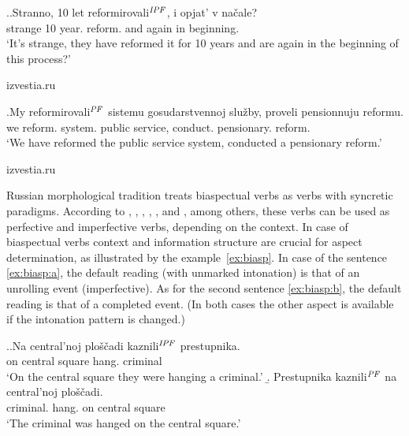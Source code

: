 \ex.\label{ex:biaspectual:borrowed}\ag.Stranno, 10 let reformirovali$^{\mathit{IPF}}$, i opjat' v na\v{c}ale?\\
strange 10 year. reform. and again in beginning.\\
\vspace{0.5em}
`It's strange, they have reformed it for 10 years and are again in the beginning of this process?'
\begin{flushright}
\vspace{-0.5em}
izvestia.ru
\end{flushright}
\bg.My reformirovali$^{\mathit{PF}}$ sistemu gosudarstvennoj slu\v{z}by, proveli pensionnuju reformu.\\
we reform. system. public service, conduct. pensionary. reform.\\
\vspace{0.5em}
`We have reformed the public service system, conducted a pensionary reform.'
\begin{flushright}
\vspace{-0.5em}
izvestia.ru
\end{flushright}

Russian morphological tradition treats biaspectual verbs as verbs with syncretic paradigms. According to \citet{Galton:76}, \citet{Rosenthal:76}, \citet{Shvedova:82}, \citet{Certkova:96}, \citet{ZaliznjakShmelev:00}, and \citet{Janda:07a}, among others,  these verbs can be used as perfective and imperfective verbs, depending on the context. In case of biaspectual verbs context and information structure are crucial for aspect determination, as illustrated by the example~\ref{ex:biasp}. In case of the sentence \ref{ex:biasp:a}, the default reading (with unmarked intonation) is that of an unrolling event (imperfective). As for the second sentence \ref{ex:biasp:b}, the default reading is that of a completed event. (In both cases the other aspect is available if the intonation pattern is changed.)

\ex.\label{ex:biasp}\a.\label{ex:biasp:a}\gll Na central'noj plo\v{s}\v{c}adi kaznili$^{\mathit{IPF}}$ prestupnika.\\
on central square hang. criminal\\
\glt `On the central square they were hanging a criminal.'
\b.\label{ex:biasp:b} \gll Prestupnika kaznili$^{\mathit{PF}}$ na central'noj plo\v{s}\v{c}adi.\\
criminal. hang. on central square\\
\glt `The criminal was hanged on the central square.'

